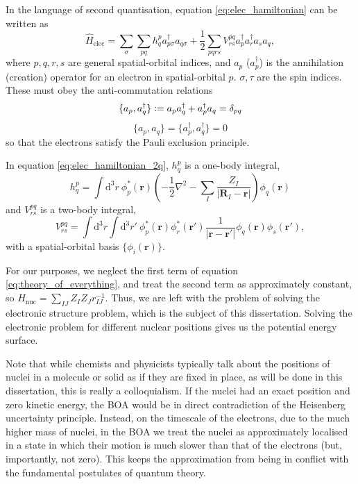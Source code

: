 In the language of second quantisation, equation \ref{eq:elec_hamiltonian} can be written as
\begin{equation}
\label{eq:elec_hamiltonian_2q}
\hat H_\mathrm{elec} = \sum_\sigma\sum_{pq} h^p_{q}a_{p\sigma}^\dag a_{q\sigma}+\frac 12 \sum_{pqrs} V^{pq}_{rs}a_{p}^\dag a_{r}^\dag a_{s}a_{q},
\end{equation}
where $p,q,r,s$ are general spatial-orbital indices, and $a_{p}$ ($a_{p}^\dag$) is the annihilation (creation) operator for an electron in spatial-orbital $p$. $\sigma,\tau$ are the spin indices. These must obey the anti-commutation relations
\begin{equation}
    \{a_{p},a_{q}^\dag\}
    \mathrel{\mathop:}=
    a_{p}a_{q}^\dag + a_{p}^\dag a_{q}
    =\delta_{pq}
\end{equation}
\begin{equation}
    \{a_{p},a_{q}\} = \{a_{p}^\dag,a_{q}^\dag\} = 0
\end{equation}
so that the electrons satisfy the Pauli exclusion principle.

In equation \ref{eq:elec_hamiltonian_2q}, $h^p_{q}$ is a one-body integral,
\begin{equation}
\label{eq:hij}
h^p_{q} = \int \mathrm{d}^3r\ \phi_p^*(\mathbf{r})\left(-\frac 12 \nabla^2 - \sum_I \frac{Z_I}{|\mathbf{R}_I-\mathbf r|}\right)\phi_q(\mathbf{r})
\end{equation}
and $V^{pq}_{rs}$ is a two-body integral,
\begin{equation}
    V^{pq}_{rs} = \int \mathrm{d}^3r\int\mathrm{d}^3r'\ \phi_p^*(\mathbf{r})\phi_r^*(\mathbf{r}')\frac{1}{|\mathbf{r}-\mathbf{r}'|}\phi_q(\mathbf{r})\phi_s(\mathbf{r}'),
\end{equation}
with a spatial-orbital basis $\{\phi_i(\mathbf{r})\}$.

For our purposes, we neglect the first term of equation \ref{eq:theory_of_everything}, and treat the second term as approximately constant, so $\hat H_\mathrm{nuc} = \sum_{IJ} Z_IZ_Jr_{IJ}^{-1}$. Thus, we are left with the problem of solving the electronic structure problem, which is the subject of this dissertation. Solving the electronic problem for different nuclear positions gives us the potential energy surface.

Note that while chemists and physicists typically talk about the positions of nuclei in a molecule or solid as if they are fixed in place, as will be done in this dissertation, this is really a colloquialism. If the nuclei had an exact position and zero kinetic energy, the \gls{BOA} would be in direct contradiction of the Heisenberg uncertainty principle. Instead, on the timescale of the electrons, due to the much higher mass of nuclei, in the \gls{BOA} we treat the nuclei as approximately localised in a state in which their motion is much slower than that of the electrons (but, importantly, not zero). This keeps the approximation from being in conflict with the fundamental postulates of quantum theory.

